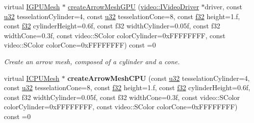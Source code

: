 \begin{DoxyCompactItemize}
\item 
virtual \hyperlink{classirr_1_1scene_1_1IMesh}{I\+G\+P\+U\+Mesh} $\ast$ \hyperlink{classirr_1_1scene_1_1IGeometryCreator_abca19991f6bbfbc05b64ab45c2df80c7}{create\+Arrow\+Mesh\+G\+PU} (\hyperlink{classirr_1_1video_1_1IVideoDriver}{video\+::\+I\+Video\+Driver} $\ast$driver, const \hyperlink{namespaceirr_a0416a53257075833e7002efd0a18e804}{u32} tesselation\+Cylinder=4, const \hyperlink{namespaceirr_a0416a53257075833e7002efd0a18e804}{u32} tesselation\+Cone=8, const \hyperlink{namespaceirr_a0277be98d67dc26ff93b1a6a1d086b07}{f32} height=1.f, const \hyperlink{namespaceirr_a0277be98d67dc26ff93b1a6a1d086b07}{f32} cylinder\+Height=0.\+6f, const f32 width\+Cylinder=0.\+05f, const f32 width\+Cone=0.\+3f, const video\+::\+S\+Color color\+Cylinder=0x\+F\+F\+F\+F\+F\+F\+F\+F, const video\+::\+S\+Color color\+Cone=0x\+F\+F\+F\+F\+F\+F\+F\+F) const  =0
\begin{DoxyCompactList}\small\item\em Create an arrow mesh, composed of a cylinder and a cone. \end{DoxyCompactList}\item 
virtual \hyperlink{classirr_1_1scene_1_1IMesh}{I\+C\+P\+U\+Mesh} $\ast$ {\bfseries create\+Arrow\+Mesh\+C\+PU} (const \hyperlink{namespaceirr_a0416a53257075833e7002efd0a18e804}{u32} tesselation\+Cylinder=4, const \hyperlink{namespaceirr_a0416a53257075833e7002efd0a18e804}{u32} tesselation\+Cone=8, const \hyperlink{namespaceirr_a0277be98d67dc26ff93b1a6a1d086b07}{f32} height=1.f, const \hyperlink{namespaceirr_a0277be98d67dc26ff93b1a6a1d086b07}{f32} cylinder\+Height=0.\+6f, const f32 width\+Cylinder=0.\+05f, const f32 width\+Cone=0.\+3f, const video\+::\+S\+Color color\+Cylinder=0x\+F\+F\+F\+F\+F\+F\+F\+F, const video\+::\+S\+Color color\+Cone=0x\+F\+F\+F\+F\+F\+F\+F\+F) const  =0\hypertarget{classirr_1_1scene_1_1IGeometryCreator_a654005b83bc734daf6531d096e647a18}{}\label{classirr_1_1scene_1_1IGeometryCreator_a654005b83bc734daf6531d096e647a18}


\end{DoxyCompactItemize}
